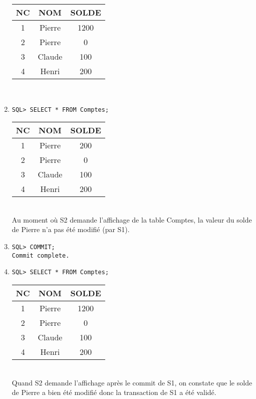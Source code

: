 \documentclass{article}
\begin{document}
\begin{enumerate}[label=\arabic*)]
\begin{tabular}{|c|c|c|}
	\hline
        	NC & NOM & SOLDE \\
	\hline        
 	1 & Pierre & 1200 \\
	\hline         
	2 & Pierre & 0 \\
	\hline
	3 & Claude & 100 \\
	\hline
	4 & Henri & 200 \\
	\hline
\end{tabular} \\
\newline
\newline
	\item {}
		\begin{lstlisting}
SQL> SELECT * FROM Comptes;
		\end{lstlisting}

\begin{tabular}{|c|c|c|}
	\hline
        	NC & NOM & SOLDE \\
	\hline        
 	1 & Pierre & 200 \\
	\hline         
	2 & Pierre & 0 \\
	\hline
	3 & Claude & 100 \\
	\hline
	4 & Henri & 200 \\
	\hline
\end{tabular} \\

 Au moment où S2 demande l'affichage de la table Comptes, la valeur du solde de Pierre n'a pas été modifié (par S1).
	\item {}
		\begin{lstlisting}
SQL> COMMIT;
Commit complete.
		\end{lstlisting}

	\item {} 
		\begin{lstlisting}
SQL> SELECT * FROM Comptes;
		\end{lstlisting}

\begin{tabular}{|c|c|c|}
	\hline
        	NC & NOM & SOLDE \\
	\hline        
 	1 & Pierre & 1200 \\
	\hline         
	2 & Pierre & 0 \\
	\hline
	3 & Claude & 100 \\
	\hline
	4 & Henri & 200 \\
	\hline
\end{tabular} \\

Quand S2 demande l'affichage après le commit de S1, on constate que le solde de Pierre a bien été modifié donc la transaction de S1 a été validé.
\newline
\end{enumerate}
\end{document}
